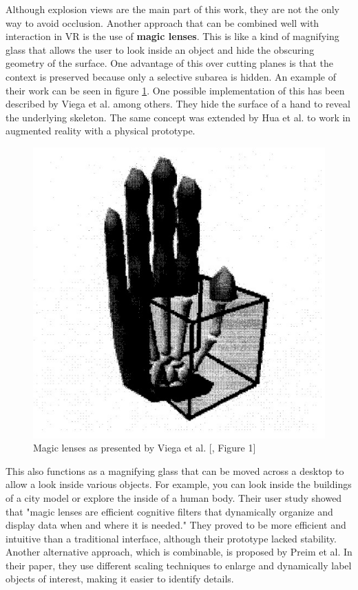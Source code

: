 Although explosion views are the main part of this work, they are not the only way to avoid occlusion. 
Another approach that can be combined well with interaction in VR is the use of \textbf{magic lenses}.
This is like a kind of magnifying glass that allows the user to look inside an object and hide the obscuring geometry of the surface.
One advantage of this over cutting planes is that the context is preserved because only a selective subarea is hidden.   
An example of their work can be seen in figure \ref{fig:viega_hand}.
One possible implementation of this has been described by Viega et al. among others.
They hide the surface of a hand to reveal the underlying skeleton.\cite{Viega_1996}
The same concept was extended by Hua et al. to work in augmented reality with a physical prototype.
\begin{figure}
	\centering
	\vspace{-0.4cm}
	\includegraphics[width=1\linewidth]{fig/Images/Viega_fig1}
	\caption[]{Magic lenses as presented by Viega et al. [\cite{Viega_1996}, Figure 1]}
	\label{fig:viega_hand}
	\vspace{-0.1cm}
\end{figure}
This also functions as a magnifying glass that can be moved across a desktop to allow a look inside various objects.
For example, you can look inside the buildings of a city model or explore the inside of a human body.
Their user study showed that "magic lenses are efficient cognitive filters that dynamically organize and display data when and where it is needed."\cite{Hua_2006}
They proved to be more efficient and intuitive than a traditional interface, although their prototype lacked stability.\cite{Hua_2006}
Another alternative approach, which is combinable, is proposed by Preim et al. In their paper, they use different scaling techniques to enlarge and dynamically label objects of interest, making it easier to identify details.\cite{Preim_1997}

